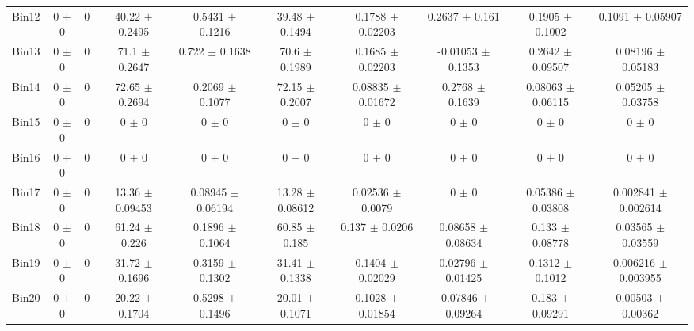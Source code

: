 \begin{tabular}{@{\extracolsep{4pt}}lccccccccc@{}}
     Bin12 & 0 $\pm$ 0 & 0 & 40.22 $\pm$ 0.2495 & 0.5431 $\pm$ 0.1216 & 39.48 $\pm$ 0.1494 & 0.1788 $\pm$ 0.02203 & 0.2637 $\pm$ 0.161 & 0.1905 $\pm$ 0.1002 & 0.1091 $\pm$ 0.05907 \\ 
     Bin13 & 0 $\pm$ 0 & 0 & 71.1 $\pm$ 0.2647 & 0.722 $\pm$ 0.1638 & 70.6 $\pm$ 0.1989 & 0.1685 $\pm$ 0.02203 & -0.01053 $\pm$ 0.1353 & 0.2642 $\pm$ 0.09507 & 0.08196 $\pm$ 0.05183 \\ 
     Bin14 & 0 $\pm$ 0 & 0 & 72.65 $\pm$ 0.2694 & 0.2069 $\pm$ 0.1077 & 72.15 $\pm$ 0.2007 & 0.08835 $\pm$ 0.01672 & 0.2768 $\pm$ 0.1639 & 0.08063 $\pm$ 0.06115 & 0.05205 $\pm$ 0.03758 \\ 
     Bin15 & 0 $\pm$ 0 & 0 & 0 $\pm$ 0 & 0 $\pm$ 0 & 0 $\pm$ 0 & 0 $\pm$ 0 & 0 $\pm$ 0 & 0 $\pm$ 0 & 0 $\pm$ 0 \\ 
     Bin16 & 0 $\pm$ 0 & 0 & 0 $\pm$ 0 & 0 $\pm$ 0 & 0 $\pm$ 0 & 0 $\pm$ 0 & 0 $\pm$ 0 & 0 $\pm$ 0 & 0 $\pm$ 0 \\ 
     Bin17 & 0 $\pm$ 0 & 0 & 13.36 $\pm$ 0.09453 & 0.08945 $\pm$ 0.06194 & 13.28 $\pm$ 0.08612 & 0.02536 $\pm$ 0.0079 & 0 $\pm$ 0 & 0.05386 $\pm$ 0.03808 & 0.002841 $\pm$ 0.002614 \\ 
     Bin18 & 0 $\pm$ 0 & 0 & 61.24 $\pm$ 0.226 & 0.1896 $\pm$ 0.1064 & 60.85 $\pm$ 0.185 & 0.137 $\pm$ 0.0206 & 0.08658 $\pm$ 0.08634 & 0.133 $\pm$ 0.08778 & 0.03565 $\pm$ 0.03559 \\ 
     Bin19 & 0 $\pm$ 0 & 0 & 31.72 $\pm$ 0.1696 & 0.3159 $\pm$ 0.1302 & 31.41 $\pm$ 0.1338 & 0.1404 $\pm$ 0.02029 & 0.02796 $\pm$ 0.01425 & 0.1312 $\pm$ 0.1012 & 0.006216 $\pm$ 0.003955 \\ 
     Bin20 & 0 $\pm$ 0 & 0 & 20.22 $\pm$ 0.1704 & 0.5298 $\pm$ 0.1496 & 20.01 $\pm$ 0.1071 & 0.1028 $\pm$ 0.01854 & -0.07846 $\pm$ 0.09264 & 0.183 $\pm$ 0.09291 & 0.00503 $\pm$ 0.00362 \\ 
\hline\hline
  \end{tabular}
